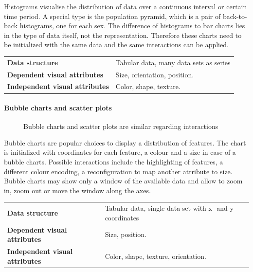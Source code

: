 \documentclass{article}
\newcommand{\conceptTable}[3]{%
    \begin{center}
    {\small
        \begin{tabulary}{\textwidth}{ll}
            \bf Data structure & #1 \\

            \bf Dependent visual attributes & #2 \\

            \bf Independent visual attributes & #3  \\
        \end{tabulary}
    }
    \end{center}
}
\begin{document}
Histograms visualise the distribution of data over a continuous interval or certain time period.
A special type is the population pyramid, which is a pair of back-to-back histograms, one for each sex.
The difference of histograms to bar charts lies in the type of data itself, not the representation.
Therefore these charts need to be initialized with the same data and the same interactions can be applied.

\conceptTable{Tabular data, many data sets as series}{Size, orientation, position.}{Color, shape, texture.}

\paragraph{Bubble charts and scatter plots}

\begin{figure}
  \centering
    \qquad
    \caption{Bubble charts and scatter plots are similar regarding interactions}%
    \label{fig:concept:chart-types:bubble-chart}
\end{figure}

Bubble charts are popular choices to display a distribution of features.
The chart is initialized with coordinates for each feature, a colour and a size in case of a bubble charts.
Possible interactions include the highlighting of features, a different colour encoding, a reconfiguration to map another attribute to size.
Bubble charts may show only a window of the available data and allow to zoom in, zoom out or move the window along the axes.

\conceptTable{Tabular data, single data set with x- and y-coordinates}{Size, position.}{Color, shape, texture, orientation.}
\end{document}
